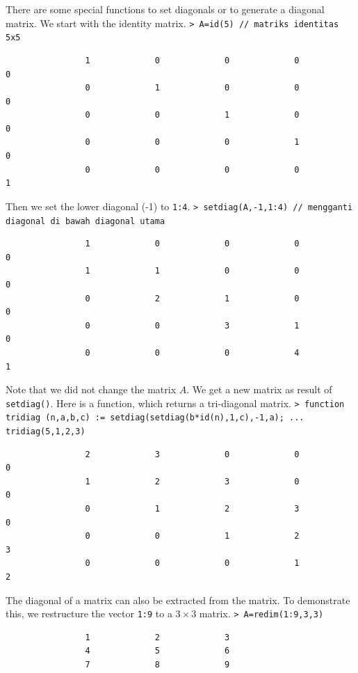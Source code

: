 \documentclass[11pt, a4paper]{article}
\newcommand{\emtcmd}[1]{\noindent\texttt{\textcolor{emtcommand}{>}\ #1}\par\smallskip}
\begin{document}
There are some special functions to set diagonals or to generate a diagonal matrix. We start with the identity matrix.
\emtcmd{A=id(5) \textcolor{emtcomment}{// matriks identitas 5x5}}
\begin{verbatim}
                1             0             0             0             0
                0             1             0             0             0
                0             0             1             0             0
                0             0             0             1             0
                0             0             0             0             1
\end{verbatim}

Then we set the lower diagonal (-1) to \texttt{1:4}.
\emtcmd{setdiag(A,-1,1:4) \textcolor{emtcomment}{// mengganti diagonal di bawah diagonal utama}}
\begin{verbatim}
                1             0             0             0             0
                1             1             0             0             0
                0             2             1             0             0
                0             0             3             1             0
                0             0             0             4             1
\end{verbatim}

Note that we did not change the matrix $A$. We get a new matrix as result of \texttt{setdiag()}. Here is a function, which returns a tri-diagonal matrix.
\emtcmd{function tridiag (n,a,b,c) := setdiag(setdiag(b*id(n),1,c),-1,a); ... \\
\hspace*{1em} tridiag(5,1,2,3)}
\begin{verbatim}
                2             3             0             0             0
                1             2             3             0             0
                0             1             2             3             0
                0             0             1             2             3
                0             0             0             1             2
\end{verbatim}

The diagonal of a matrix can also be extracted from the matrix. To demonstrate this, we restructure the vector \texttt{1:9} to a $3 \times 3$ matrix.
\emtcmd{A=redim(1:9,3,3)}
\begin{verbatim}
                1             2             3
                4             5             6
                7             8             9
\end{verbatim}
\end{document}
